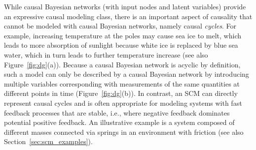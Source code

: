 While causal Bayesian networks (with input nodes and latent variables) provide an expressive causal modeling class, there is an important aspect of causality that cannot be modeled with causal Bayesian networks, namely causal \emph{cycles}.
For example, increasing temperature at the poles may cause sea ice to melt, which leads to more absorption of sunlight because white ice is replaced by blue sea water, which in turn leads to further temperature increase (see also Figure~\ref{fig:dg}(a)).
Because a causal Bayesian network is acyclic by definition, such a model can only be described by a causal Bayesian network by introducing multiple variables corresponding with measurements of the same quantities at different points in time (Figure~\ref{fig:dg}(b)).
In contrast, an SCM can directly represent causal cycles and is often appropriate for modeling systems with fast feedback processes that are stable, i.e., where negative feedback dominates potential positive feedback. 
An illustrative example is a system composed of different masses connected via springs in an environment with friction (see also Section~\ref{sec:scm_examples}).

